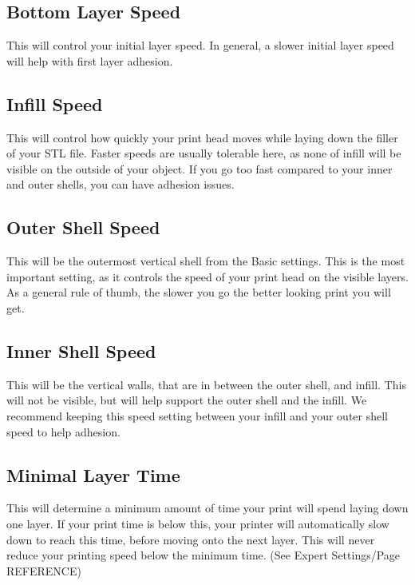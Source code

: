 \subsection{Bottom Layer Speed}

This will control your initial layer speed. In general, a slower initial layer speed will help with first layer adhesion. 

\subsection{Infill Speed}

This will control how quickly your print head moves while laying down the filler of your STL file. Faster speeds are usually tolerable here, as none of infill will be visible on the outside of your object. If you go too fast compared to your inner and outer shells, you can have adhesion issues.

\subsection{Outer Shell Speed}

This will be the outermost vertical shell from the Basic settings. This is the most important setting, as it controls the speed of your print head on the visible layers. As a general rule of thumb, the slower you go the better looking print you will get. 

\subsection{Inner Shell Speed}

This will be the vertical walls, that are in between the outer shell, 	and infill. This will not be visible, but will help support the outer shell and the infill. We recommend keeping this speed setting between your infill and your outer shell speed to help adhesion.

\subsection{Minimal Layer Time}

This will determine a minimum amount of time your print will spend laying down one layer. If your print time is below this, your printer will automatically slow down to reach this time, before moving onto the next layer. This will never reduce your printing speed below the minimum time. (See Expert Settings/Page REFERENCE)

